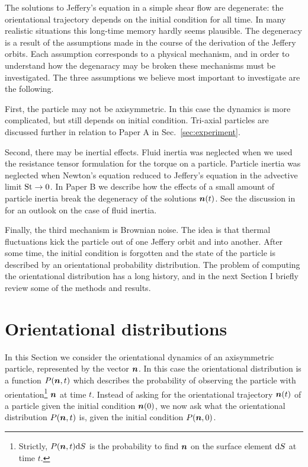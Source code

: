 \documentclass[thesis.tex]{subfiles}
\begin{document}
The solutions to Jeffery's equation in a simple shear flow are degenerate: the orientational trajectory depends on the initial condition for all time. In many realistic situations this long-time memory hardly seems plausible. The degeneracy is a result of the assumptions made in the course of the derivation of the Jeffery orbits. Each assumption corresponds to a physical mechanism, and in order to understand how the degenaracy may be broken these mechanisms must be investigated. The three assumptions we believe most important to investigate are the following.

First, the particle may not be axisymmetric. In this case the dynamics is more complicated, but still depends on initial condition. Tri-axial particles are discussed further in relation to Paper A in Sec.~\ref{sec:experiment}.

Second, there may be inertial effects. Fluid inertia was neglected when we used the resistance tensor formulation  for the torque on a particle. Particle inertia was neglected when Newton's equation reduced to Jeffery's equation in the advective limit $\mbox{St} \to 0$. In Paper B we describe how the effects of a small amount of particle inertia break the degeneracy of the solutions $\mbox{\boldmath$n$}(t)$. See the discussion in  for an outlook on the case of fluid inertia.

Finally, the third mechanism is Brownian noise. The idea is that thermal fluctuations kick the particle out of one Jeffery orbit and into another. After some time, the initial condition is forgotten and the state of the particle is described by an orientational probability distribution. The problem of computing the orientational distribution has a long history, and in the next Section I briefly review some of the methods and results.

\section{Orientational distributions}

In this Section we consider the orientational dynamics of an axisymmetric particle, represented by the vector $\mbox{\boldmath$n$}$. In this case the orientational distribution is a function $P(\mbox{\boldmath$n$}, t)$ which describes the probability of observing the particle with orientation\footnote{Strictly, $P(\mbox{\boldmath$n$}, t)\mathrm{d} S$ is the probability to find $\mbox{\boldmath$n$}$ on the surface element $\mathrm{d} S$ at time $t$.} $\mbox{\boldmath$n$}$ at time $t$. Instead of asking for the orientational trajectory $\mbox{\boldmath$n$}(t)$ of a particle given the initial condition $\mbox{\boldmath$n$}(0)$, we now ask what the orientational distribution $P(\mbox{\boldmath$n$}, t)$ is, given the initial condition $P(\mbox{\boldmath$n$}, 0)$.
\end{document}
